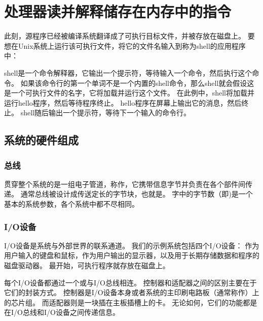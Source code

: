 \section{处理器读并解释储存在内存中的指令}
{
    此刻，源程序已经被编译系统翻译成了可执行目标文件，并被存放在磁盘上。
    要想在Unix系统上运行该可执行文件，将它的文件名输入到称为shell的应用程序中：

    \begin{codelist}
        
    \end{codelist}

    shell是一个命令解释器，它输出一个提示符，等待输入一个命令，然后执行这个命令。
    如果该命令行的第一个单词不是一个内置的shell命令，那么shell就会假设这是一个可执行文件的名字，它将加载并运行这个文件。
    在此例中，shell将加载并运行hello程序，然后等待程序终止。
    hello程序在屏幕上输出它的消息，然后终止。
    shell随后输出一个提示符，等待下一个输入的命令行。

    \subsection{系统的硬件组成}
    {
        \subsubsection{总线}
        {
            贯穿整个系统的是一组电子管道，称作，它携带信息字节并负责在各个部件间传递。
            通常总线被设计成传送定长的字节块，也就是。
            字中的字节数（即)是一个基本的系统参数，各个系统中都不尽相同。
        }

        \subsubsection{I/O设备}
        {
            I/O设备是系统与外部世界的联系通道。
            我们的示例系统包括四个I/O设备：
            作为用户输入的键盘和鼠标，作为用户输出的显示器，以及用于长期存储数据和程序的磁盘驱动器。
            最开始，可执行程序就存放在磁盘上。

            每个I/O设备都通过一个或与I/O总线相连。
            控制器和适配器之间的区别主要在于它们的封装方式。
            控制器是I/O设备本身或者系统的主印刷电路板（通常称作）上的芯片组。
            而适配器则是一块插在主板插槽上的卡。
            无论如何，它们的功能都是在I/O总线和I/O设备之间传递信息。
        }

}}
